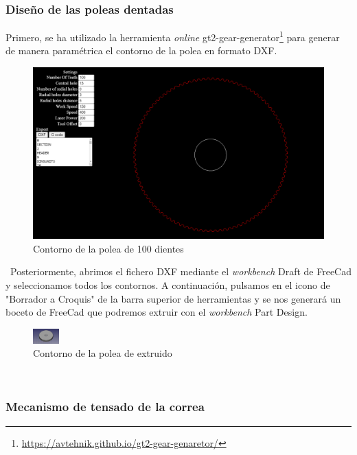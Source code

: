 \subsubsection{Diseño de las poleas dentadas}
Primero, se ha utilizado la herramienta \textit{online} 
gt2-gear-generator\footnote{\url{https://avtehnik.github.io/gt2-gear-genaretor/}} para generar de manera paramétrica el contorno de la polea 
en formato DXF.\\
\begin{figure} [ht!]
  \begin{center}
    \includegraphics[width=14cm]{figs/dxf_polea.png}
  \end{center}
  \caption{Contorno de la polea de 100 dientes}
\end{figure}\ 
Posteriormente, abrimos el fichero DXF mediante el \textit{workbench} Draft de FreeCad y seleccionamos todos los contornos. A continuación, 
pulsamos en el icono de "Borrador a Croquis" de la barra superior de herramientas y se nos generará un boceto de FreeCad que podremos extruir 
con el \textit{workbench} Part Design. 
\begin{figure} [ht!]
  \begin{center}
    \includegraphics[width=1cm]{figs/polea_freecad.png}
  \end{center}
  \caption{Contorno de la polea de extruido}
\end{figure}\ 

\subsubsection{Mecanismo de tensado de la correa}


